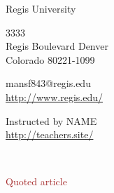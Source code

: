 \documentclass[11pt,a4paper]{scrartcl} %
\begin{document}
\begin{cv}{}
        \begin{cvlist}{\textcolor{brown}{}}\label{PersDat}  
            \item   Regis University
            \item   3333\\
                    Regis Boulevard Denver \\	
                    Colorado 80221-1099
            \item   mansf843@regis.edu\\				
                    \url{http://www.regis.edu/}				
        \end{cvlist}
        \begin{cvlist}{}\label{irgendwas}
            \item Instructed by NAME\\
             \url{http://teachers.site/}
        \end{cvlist}
    \end{cv}
\clearpage

\noindent
\textcolor{Maroon}{}\\
\textcolor{brown}{}
\begin{verse}

\end{verse}
\textcolor{brown}{Quoted article}~\cite{key here}
\clearpage
\title{\textcolor{Maroon}{\rmfamily\normalfont{}}}
    \author{\textcolor{brown}{}}
    \date{} %
    
    \maketitle
    
    \begin{abstract}
  
    \end{abstract}
       
    \tableofcontents
    
    \section{}

    \nocite{*}
    
    
\end{document}
